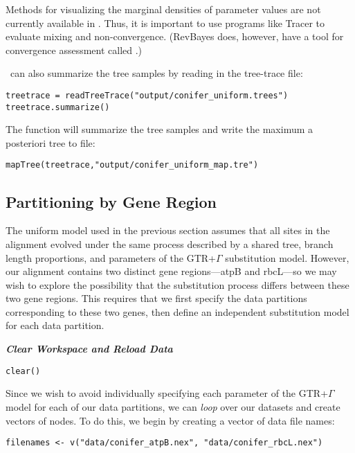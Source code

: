 Methods for visualizing the marginal densities of parameter values are not currently available in \RevBayes. Thus, it is important to use programs like Tracer \citep{rambaut09} to evaluate mixing and non-convergence. (RevBayes does, however, have a tool for convergence assessment called .)

\RevBayes~can also summarize the tree samples by reading in the tree-trace file:
{\tt \begin{snugshade*}
\begin{lstlisting}
treetrace = readTreeTrace("output/conifer_uniform.trees")
treetrace.summarize()
\end{lstlisting}
\end{snugshade*}}


The  function will summarize the tree samples and write the maximum a posteriori tree to file:
{\tt \begin{snugshade*}
\begin{lstlisting}
mapTree(treetrace,"output/conifer_uniform_map.tre")
\end{lstlisting}
\end{snugshade*}}


\bigskip
\subsection{Partitioning by Gene Region}\label{secByGene}

The uniform model used in the previous section assumes that all sites in the alignment evolved under the same process described by a shared tree, branch length proportions, and parameters of the GTR+$\Gamma$ substitution model.
However, our alignment contains two distinct gene regions---atpB and rbcL---so we may wish to explore the possibility that the substitution process differs between these two gene regions.
This requires that we first specify the data partitions corresponding to these two genes, then define an independent substitution model for each data partition. 

\textbf{\textit{Clear Workspace and Reload Data}}

{\tt \begin{snugshade*}
\begin{lstlisting}
clear()
\end{lstlisting}
\end{snugshade*}}

Since we wish to avoid individually specifying each parameter of the GTR+$\Gamma$ model for each of our data partitions, we can \textit{loop} over our datasets and create vectors of nodes.
To do this, we begin by creating a vector of data file names:
{\tt \begin{snugshade*}
\begin{lstlisting}
filenames <- v("data/conifer_atpB.nex", "data/conifer_rbcL.nex")
\end{lstlisting}
\end{snugshade*}}

